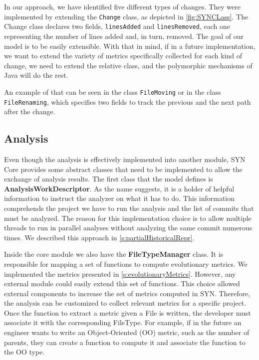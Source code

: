 In our approach, we have identified five different types of changes. They were implemented by extending the \texttt{Change} class, as depicted in \autoref{fig:SYNCLass}. The Change class declares two fields, \texttt{linesAdded} and \texttt{linesRemoved}, each one representing the number of lines added and, in turn, removed. 
The goal of our model is to be easily extensible. With that in mind, if in a future implementation, we want to extend the variety of metrics specifically collected for each kind of change, we need to extend the relative class, and the polymorphic mechanisms of Java will do the rest. 

An example of that can be seen in the class \texttt{FileMoving} or in the class \texttt{FileRenaming}, which specifies two fields to track the previous and the next path after the change. 




\subsection*{Analysis}
Even though the analysis is effectively implemented into another module, SYN Core provides some abstract classes that need to be implemented to allow the exchange of analysis results. 
The first class that the model defines is \textbf{AnalysisWorkDescriptor}.
As the name suggests, it is a holder of helpful information to instruct the analyzer on what it has to do. This information comprehends the project we have to run the analysis and the list of commits that must be analyzed. 
The reason for this implementation choice is to allow multiple threads to run in parallel analyses without analyzing the same commit numerous times. 
We described this approach in \autoref{s:partialHistoricalRepr}.


Inside the core module we also have the \textbf{FileTypeManager} class. It is responsible for mapping a set of functions to compute evolutionary metrics. We implemented the metrics presented in \autoref{s:evolutionaryMetrics}. However, any external module could easily extend this set of functions. This choice allowed external components to increase the set of metrics computed in SYN. Therefore, the analysis can be customized to collect relevant metrics for a specific project. Once the function to extract a metric given a File is written, the developer must associate it with the corresponding FileType. For example, if in the future an engineer wants to write an  Object-Oriented (OO) metric, such as the number of parents, they can create a function to compute it and associate the function to the OO type.


